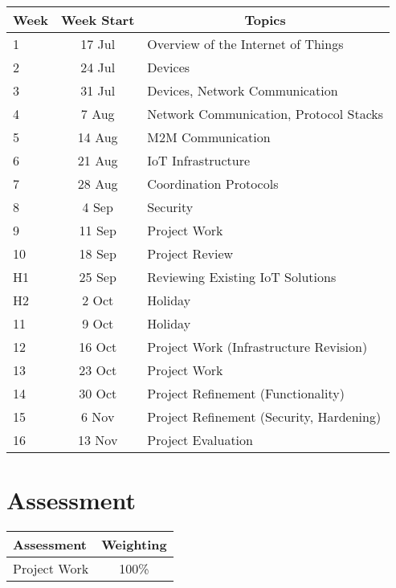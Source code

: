 \documentclass{article}
\begin{document}
\renewcommand{\arraystretch}{1.5}
\begin{tabular}{|l|c|l|}
\hline
 Week & Week Start & \multicolumn{1}{c|}{Topics}             \\ \hline
 1    & 17 Jul     & Overview of the Internet of Things      \\ \hline
 2    & 24 Jul     & Devices                                 \\ \hline
 3    &  31 Jul     & Devices, Network Communication          \\ \hline
 4    & 7 Aug     & Network Communication, Protocol Stacks  \\ \hline
 5    & 14 Aug     & M2M Communication                       \\ \hline
 6    & 21 Aug     & IoT Infrastructure                      \\ \hline
 7    & 28 Aug     & Coordination Protocols                  \\ \hline
 8    &  4 Sep     & Security                                \\ \hline
 9    & 11 Sep     & Project Work                            \\ \hline
 10   & 18 Sep     & Project Review                          \\ \hline
 H1   & 25 Sep     & Reviewing Existing IoT Solutions                                 \\ \hline
 H2   &  2 Oct     & Holiday                                 \\ \hline
 11   & 9 Oct     &  Holiday       \\ \hline
 12   & 16 Oct     & Project Work (Infrastructure Revision)  \\ \hline
 13   & 23 Oct     & Project Work                            \\ \hline
 14   &  30 Oct     & Project Refinement (Functionality)      \\ \hline
 15   &  6 Nov     & Project Refinement (Security, Hardening)\\ \hline
 16   & 13 Nov     & Project Evaluation                      \\ \hline
\end{tabular}

\section*{Assessment}

\begin{tabular}{|l|c|}
\hline
Assessment                  &  Weighting \\ \hline
Project Work                &  100\% \\ \hline
\end{tabular}
\end{document}

